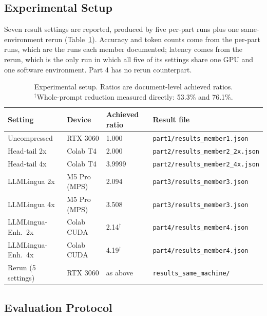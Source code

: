 \documentclass[10pt,a4paper,twocolumn]{article}
\begin{document}
\subsection{Experimental Setup}

Seven result settings are reported, produced by five per-part runs plus one
same-environment rerun (Table~\ref{tab:setup}). Accuracy and token counts come from
the per-part runs, which are the runs each member documented; latency comes from
the rerun, which is the only run in which all five of its settings share one GPU
and one software environment. Part 4 has no rerun counterpart.

\begin{table}[t]
\centering
\footnotesize
\setlength{\tabcolsep}{6pt}
\begin{tabular}{@{}llll@{}}
\toprule
Setting & Device & Achieved ratio & Result file \\
\midrule
Uncompressed & RTX 3060 & 1.000 & \texttt{part1/results\_member1.json} \\
Head-tail 2x & Colab T4 & 2.000 & \texttt{part2/results\_member2\_2x.json} \\
Head-tail 4x & Colab T4 & 3.9999 & \texttt{part2/results\_member2\_4x.json} \\
LLMLingua 2x & M5 Pro (MPS) & 2.094 & \texttt{part3/results\_member3.json} \\
LLMLingua 4x & M5 Pro (MPS) & 3.508 & \texttt{part3/results\_member3.json} \\
LLMLingua-Enh.\ 2x & Colab CUDA & 2.14$^{\dagger}$ & \texttt{part4/results\_member4.json} \\
LLMLingua-Enh.\ 4x & Colab CUDA & 4.19$^{\dagger}$ & \texttt{part4/results\_member4.json} \\
\midrule
Rerun (5 settings) & RTX 3060 & as above & \texttt{results\_same\_machine/} \\
\bottomrule
\end{tabular}
\caption{Experimental setup. Ratios are document-level achieved ratios.\\
$^{\dagger}$Whole-prompt reduction measured directly: 53.3\% and 76.1\%.}
\label{tab:setup}
\end{table}

\subsection{Evaluation Protocol}
\label{sec:protocol}
\end{document}
